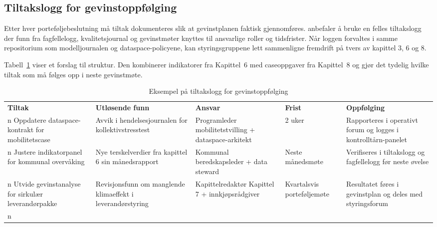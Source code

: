 \subsection*{Tiltakslogg for gevinstoppfølging}
Etter hver porteføljebeslutning må tiltak dokumenteres slik at gevinstplanen faktisk gjennomføres. \citet{digdir2022gevinst} anbefaler å bruke en felles tiltakslogg der funn fra fagfellelogg, kvalitetsjournal og gevinstmøter knyttes til ansvarlige roller og tidsfrister. Når loggen forvaltes i samme repositorium som modelljournalen og dataspace-policyene, kan styringsgruppene lett sammenligne fremdrift på tvers av kapittel 3, 6 og 8.\citep{rcn2024digitalisering}

Tabell~\ref{tab:tiltakslogg} viser et forslag til struktur. Den kombinerer indikatorer fra Kapittel~6 med caseoppgaver fra Kapittel~8 og gjør det tydelig hvilke tiltak som må følges opp i neste gevinstmøte.

\begin{table}[h]
    \centering
    \caption{Eksempel på tiltakslogg for gevinstoppfølging}
    \label{tab:tiltakslogg}
    \begin{tabular}{|p{3.0cm}|p{4.0cm}|p{3.4cm}|p{2.5cm}|p{3.1cm}|}
        \hline
        \textbf{Tiltak} & \textbf{Utløsende funn} & \textbf{Ansvar} & \textbf{Frist} & \textbf{Oppfølging} \\n        \hline
        Oppdatere dataspace-kontrakt for mobilitetscase & Avvik i hendelsesjournalen for kollektivstresstest \citep{ruter2024mobilitetslab,vegvesen2023beredskap} & Programleder mobilitetstvilling + dataspace-arkitekt & 2 uker & Rapporteres i operativt forum og logges i kontrolltårn-panelet \\n        \hline
        Justere indikatorpanel for kommunal overvåking & Nye terskelverdier fra kapittel 6 sin månedsrapport \citep{oslo2023overvann,dsb2022beredskap} & Kommunal beredskapsleder + data steward & Neste månedsmøte & Verifiseres i tiltakslogg og fagfellelogg før neste øvelse \\n        \hline
        Utvide gevinstanalyse for sirkulær leverandørpakke & Revisjonsfunn om manglende klimaeffekt i leverandørstyring \citep{statsbygg2023loopfront,hydro2023traceability} & Kapittelredaktør Kapittel 7 + innkjøpsrådgiver & Kvartalsvis porteføljemøte & Resultatet føres i gevinstplan og deles med styringsforum \citep{dfo2024kontraktsoppfolging} \\n        \hline
    \end{tabular}
\end{table}

